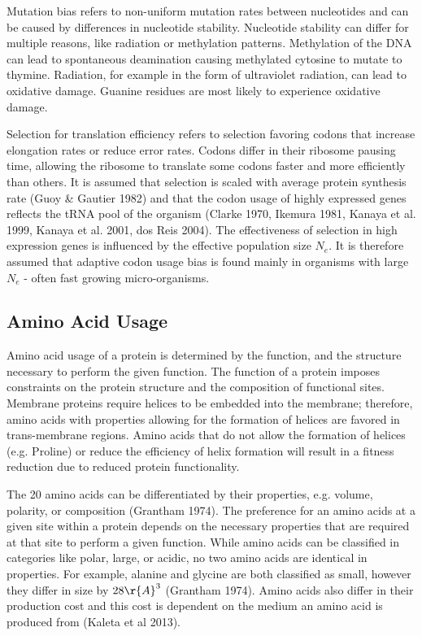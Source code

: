 Mutation bias refers to non-uniform mutation rates between nucleotides and can be caused by differences in nucleotide stability.
Nucleotide stability can differ for multiple reasons, like radiation or methylation patterns.
Methylation of the DNA can lead to spontaneous deamination causing methylated cytosine to mutate to thymine.
Radiation, for example in the form of ultraviolet radiation, can lead to oxidative damage.
Guanine residues are most likely to experience oxidative damage.

Selection for translation efficiency refers to selection favoring codons that increase elongation rates or reduce error rates.
Codons differ in their ribosome pausing time, allowing the ribosome to translate some codons faster and more efficiently than others.
It is assumed that selection is scaled with average protein synthesis rate (Guoy \& Gautier 1982) and that the codon usage of highly expressed genes reflects the tRNA pool of the organism (Clarke 1970, Ikemura 1981, Kanaya et al. 1999, Kanaya et al. 2001, dos Reis 2004). 
The effectiveness of selection in high expression genes is influenced by the effective population size $N_e$. 
It is therefore assumed that adaptive codon usage bias is found mainly in organisms with large $N_e$ - often fast growing micro-organisms.

\subsection{Amino Acid Usage}
Amino acid usage of a protein is determined by the function, and the structure necessary to perform the given function.
The function of a protein imposes constraints on the protein structure and the composition of functional sites.
Membrane proteins require helices to be embedded into the membrane; therefore, amino acids with properties allowing for the formation of helices are favored in trans-membrane regions.
Amino acids that do not allow the formation of helices (e.g. Proline) or reduce the efficiency of helix formation will result in a fitness reduction due to reduced protein functionality. 

The 20 amino acids can be differentiated by their properties, e.g. volume, polarity, or composition (Grantham 1974). 
The preference for an amino acids at a given site within a protein depends on the necessary properties that are required at that site to perform a given function.
While amino acids can be classified in categories like polar, large, or acidic, no two amino acids are identical in properties.
For example, alanine and glycine are both classified as small, however they differ in size by $28 \r{A}^3$ (Grantham 1974).
Amino acids also differ in their production cost and this cost is dependent on the medium an amino acid is produced from (Kaleta et al 2013).

